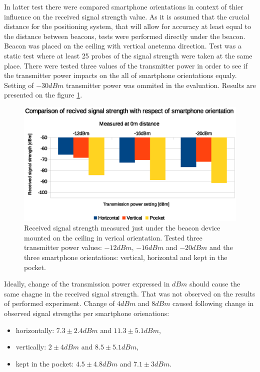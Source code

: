 \documentclass[../main.tex]{subfiles}
\begin{document}
In latter test there were compared smartphone orientations in context of thier influence on the received signal strength value. As it is assumed that the crucial distance for the positioning system, that will allow for accuracy at least equal to the distance between beacons, tests were performed directly under the beacon. Beacon was placed on the ceiling with vertical anetenna direction. Test was a static test where at least 25 probes of the signal strength were taken at the same place. There were tested three values of the transmitter power in order to see if the transmitter power impacts on the all of smartphone orientations equaly. Setting of $-30dBm$ transmitter power was ommited in the evaluation. Results are presented on the figure \ref{fig:tests_case3_rssi_vs_smartphone_orientation}.

\begin{figure}[!htbp]
\includegraphics[width=\textwidth, keepaspectratio]{pictures/tests_case3_rssi_vs_smartphone_orientation}
\centering
\caption{Received signal strength measured just under the beacon device mounted on the ceiling in verical orientation. Tested three transmitter power values: $-12dBm$, $-16dBm$ and $-20dBm$ and the three smartphone orientations: vertical, horizontal and kept in the pocket.}
\label{fig:tests_case3_rssi_vs_smartphone_orientation}
\end{figure}

Ideally, change of the transmission power expressed in $dBm$ should cause the same chagne in the received signal strength. That was not observed on the results of performed experiment. Change of $4 dBm$ and $8 dBm$ caused following change in observed signal strengths per smartphone orienations:
\begin{itemize}
	\item horizontally: $7.3\pm2.4 dBm$ and $11.3\pm5.1 dBm$,
	\item vertically: $2\pm4 dBm$ and $8.5\pm5.1 dBm$,
	\item kept in the pocket: $4.5\pm4.8 dBm$ and $7.1\pm3 dBm$.
\end{itemize}
\end{document}
